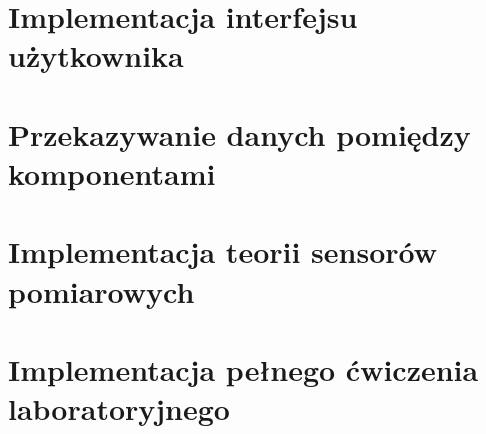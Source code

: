 \section{Implementacja interfejsu użytkownika}\label{sect:ui}

\FloatBarrier

\section{Przekazywanie danych pomiędzy komponentami}\label{sect:context}


\section{Implementacja teorii sensorów pomiarowych}\label{sect:sensors-code}


\section{Implementacja pełnego ćwiczenia laboratoryjnego}\label{sect:laboratory}

